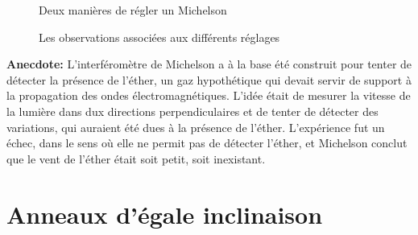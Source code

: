\documentclass{article}
\begin{document}
\begin{figure}[htbp]
  \caption{Deux manières de régler un Michelson}
\end{figure}




\begin{figure}[h!]
  \caption{Les observations associées aux différents réglages}
\end{figure}


\newpage


\textbf{Anecdote: } L'interféromètre de Michelson a à la base été construit pour tenter de détecter la présence de l'éther, un gaz hypothétique qui devait servir de support à la propagation des ondes électromagnétiques.
L'idée était de mesurer la vitesse de la lumière dans dux directions perpendiculaires et de tenter de détecter des variations, qui auraient été dues à la présence de l'éther.
L'expérience fut un échec, dans le sens où elle ne permit pas de détecter l'éther, et Michelson conclut que le vent de l'éther était soit petit, soit inexistant.

\section{Anneaux d'égale inclinaison}
\end{document}
